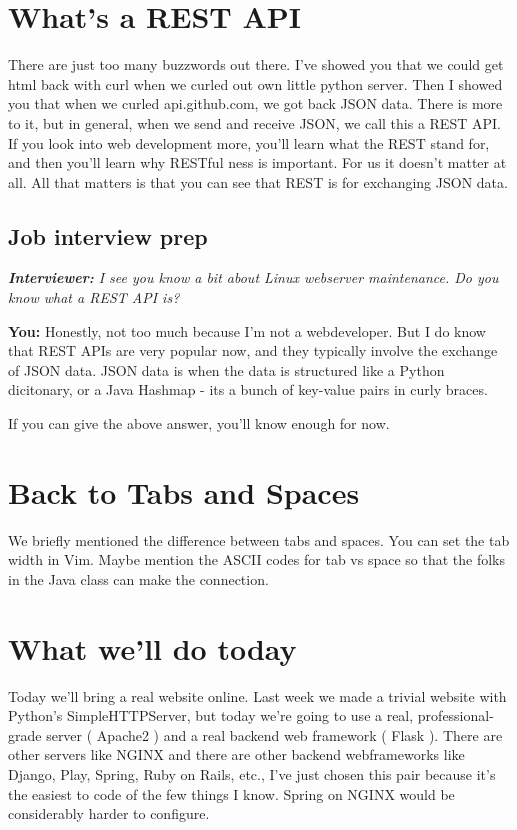 \documentclass[10pt]{article}
\begin{document}
\section{What's a REST API}
There are just too many buzzwords out there. I've showed you that we could get html back with curl when we curled out own little python server. Then I showed you that when we curled api.github.com, we got back JSON data. There is more to it, but in general, when we send and receive JSON, we call this a REST API. If you look into web development more, you'll  learn what the REST stand for, and then you'll learn why RESTful ness is important. For us it doesn't matter at all. All that matters is that you can see that REST is for exchanging JSON data.

\subsection{Job interview prep}
\noindent\textit{\textbf{Interviewer:} I see you know a bit about Linux webserver maintenance. Do you know what a REST API is?}

\noindent \textbf{You: } Honestly, not too much because I'm not a webdeveloper. But I do know that REST APIs are very popular now, and they typically involve the exchange of JSON data. JSON data is when the data is structured like a Python dicitonary, or a Java Hashmap  - its a bunch of key-value pairs in curly braces.

If you can give the above answer, you'll know enough for now.

\section{Back to Tabs and Spaces}
We briefly mentioned the difference between tabs and spaces. You can set the tab width in Vim. Maybe mention the ASCII codes for tab vs space so that the folks in the Java class can make the connection.


\section{What we'll do today}
Today we'll bring a real website online. Last week we made a trivial website with Python's SimpleHTTPServer, but today we're going to use a real, professional-grade server ( Apache2 ) and a real backend web framework ( Flask ). There are other servers like NGINX and there are other backend webframeworks like Django, Play, Spring, Ruby on Rails, etc., I've just chosen this pair because it's the easiest to code of the few things I know. Spring on NGINX would be considerably harder to configure.
\end{document}
